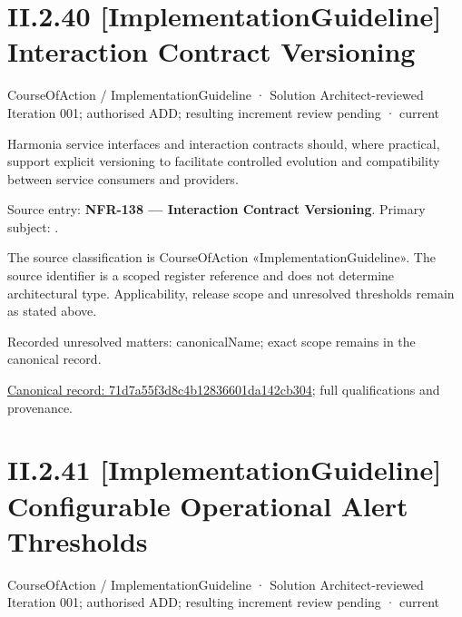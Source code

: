 \section*{II.2.40 [ImplementationGuideline] Interaction Contract Versioning}
\label{navigation:II.2.40}

\label{element:71d7a55f3d8c4b12836601da142cb304}
{\small CourseOfAction / ImplementationGuideline · Solution Architect-reviewed Iteration 001; authorised ADD; resulting increment review pending · current}\par

Harmonia service interfaces and interaction contracts should, where practical, support explicit versioning to facilitate controlled evolution and compatibility between service consumers and providers.



Source entry: \textbf{NFR-138 — Interaction Contract Versioning}. Primary subject: \texttt{}.



The source classification is CourseOfAction «ImplementationGuideline». The source identifier is a scoped register reference and does not determine architectural type. Applicability, release scope and unresolved thresholds remain as stated above.


{\small Recorded unresolved matters: canonicalName; exact scope remains in the canonical record.}\par
{\footnotesize \href{../../../../../../../continuum/strategy/course-of-action/implementation-guideline/71d7a55f3d8c4b12836601da142cb304.md}{Canonical record: 71d7a55f3d8c4b12836601da142cb304}; full qualifications and provenance.}\par
\section*{II.2.41 [ImplementationGuideline] Configurable Operational Alert Thresholds}
\label{navigation:II.2.41}

\label{element:587db702f9134c5b8292f894dbcba53d}
{\small CourseOfAction / ImplementationGuideline · Solution Architect-reviewed Iteration 001; authorised ADD; resulting increment review pending · current}\par

